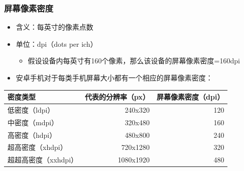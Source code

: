 \documentclass[9pt, b5paper]{article}
\begin{document}
\subsubsection{屏幕像素密度}
\label{sec-6-4-3}
\begin{itemize}
\item 含义：每英寸的像素点数
\item 单位：dpi（dots per ich）
\begin{itemize}
\item 假设设备内每英寸有160个像素，那么该设备的屏幕像素密度=160dpi
\end{itemize}
\item 安卓手机对于每类手机屏幕大小都有一个相应的屏幕像素密度：
\end{itemize}
\begin{center}
\begin{tabular}{lrr}
\hline
密度类型 & 代表的分辨率（px） & 屏幕像素密度（dpi）\\
\hline
低密度（ldpi） & 240x320 & 120\\
中密度（mdpi） & 320x480 & 160\\
高密度（hdpi） & 480x800 & 240\\
超高密度（xhdpi） & 720x1280 & 320\\
超超高密度（xxhdpi） & 1080x1920 & 480\\
\hline
\end{tabular}
\end{center}
\end{document}
